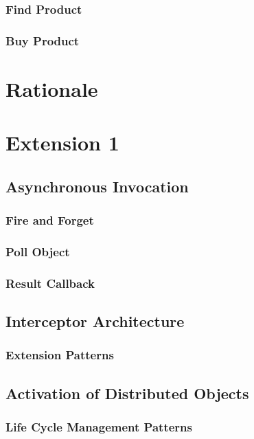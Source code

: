 \documentclass[a4paper]{article}
\begin{document}
\subsubsection{Find Product}

\subsubsection{Buy Product}

\section{Rationale}

\section{Extension 1}

\subsection{Asynchronous Invocation}
\subsubsection{Fire and Forget}
\subsubsection{Poll Object}
\subsubsection{Result Callback}

\subsection{Interceptor Architecture}
\subsubsection{Extension Patterns}

\subsection{Activation of Distributed Objects}
\subsubsection{Life Cycle Management Patterns}
\end{document}
